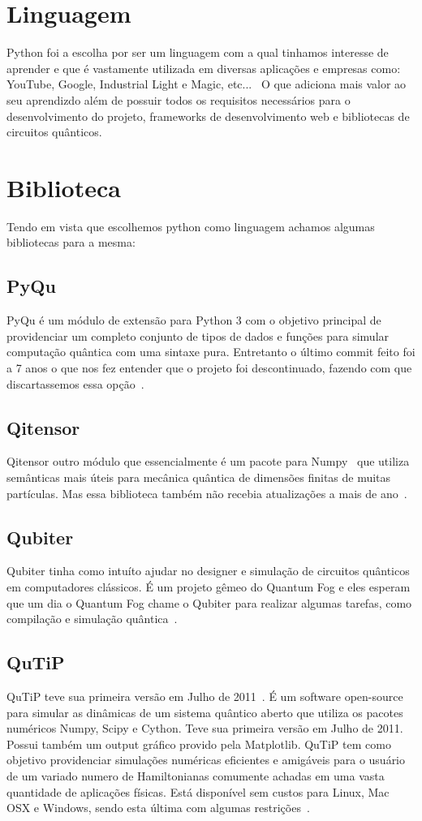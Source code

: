 \documentclass[a4paper, 12pt, oneside]{book}
\begin{document}
\section{Linguagem}

Python foi a escolha por ser um linguagem com a qual tinhamos interesse de aprender e que é vastamente utilizada em diversas aplicações e empresas como: YouTube, Google, Industrial Light e Magic, etc...~\cite{pythonquotes} O que adiciona mais valor ao seu aprendizdo além de possuir todos os requisitos necessários para o desenvolvimento do projeto, frameworks de desenvolvimento web e bibliotecas de circuitos quânticos.

\section{Biblioteca}

Tendo em vista que escolhemos python como linguagem achamos algumas bibliotecas para a mesma:
\subsection{PyQu}
PyQu é um módulo de extensão para Python 3 com o objetivo principal de providenciar um completo conjunto de tipos de dados e funções para simular computação quântica com uma sintaxe pura. Entretanto o último commit feito foi a 7 anos o que nos fez entender que o projeto foi descontinuado, fazendo com que discartassemos essa opção~\cite{pyqu}.

\subsection{Qitensor}
Qitensor outro módulo que essencialmente é um pacote para Numpy~\cite{numpy} que utiliza semânticas mais úteis para mecânica quântica de dimensões finitas de muitas partículas. Mas essa biblioteca também não recebia atualizações a mais de ano~\cite{qitensor}.
\subsection{Qubiter}
Qubiter tinha como intuíto ajudar no designer e simulação de circuitos quânticos em computadores clássicos. É um projeto gêmeo do Quantum Fog e eles esperam que um dia o Quantum Fog chame o Qubiter para realizar algumas tarefas, como compilação e simulação quântica~\cite{qubiter}.	

\subsection{QuTiP}
QuTiP teve sua primeira versão em Julho de 2011~\cite{qutipchangelog}. É um software open-source para simular as dinâmicas de um sistema quântico aberto que utiliza os pacotes numéricos Numpy, Scipy e Cython. Teve sua primeira versão em Julho de 2011. Possui também um output gráfico provido pela Matplotlib. QuTiP tem como objetivo providenciar simulações numéricas eficientes e amigáveis para o usuário de um variado numero de Hamiltonianas comumente achadas em uma vasta quantidade de aplicações físicas. Está disponível sem custos para Linux, Mac OSX e Windows, sendo esta última com algumas restrições~\cite{qutip.org}. 
\end{document}
